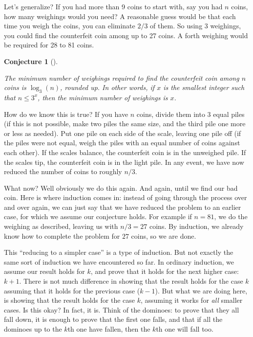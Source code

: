 \documentclass[10pt,]{book}
\theoremstyle{plain}
\newtheorem{conjecture}[theorem]{Conjecture}
\theoremstyle{definition}
\theoremstyle{definition}
\theoremstyle{definition}
\numberwithin{equation}{chapter}
\begin{document}
Let's generalize? If you had more than 9 coins to start with, say you had \(n\) coins, how many weighings would you need? A reasonable guess would be that each time you weigh the coins, you can eliminate \(2/3\) of them. So using 3 weighings, you could find the counterfeit coin among up to 27 coins. A forth weighing would be required for 28 to 81 coins.
%
\begin{conjecture}[]\label{conjecture-1}

The minimum number of weighings required to find the counterfeit coin among \(n\) coins is \(\log_3(n)\), rounded up. In other words, if \(x\) is the smallest integer such that \(n \le 3^x\), then the minimum number of weighings is \(x\).
%
\end{conjecture}
\par

How do we know this is true? If you have \(n\) coins, divide them into 3 equal piles (if this is not possible, make two piles the same size, and the third pile one more or less as needed). Put one pile on each side of the scale, leaving one pile off (if the piles were not equal, weigh the piles with an equal number of coins against each other). If the scales balance, the counterfeit coin is in the unweighed pile. If the scales tip, the counterfeit coin is in the light pile. In any event, we have now reduced the number of coins to roughly \(n/3\).
%
\par

What now? Well obviously we do this again. And again, until we find our bad coin. Here is where induction comes in: instead of going through the process over and over again, we can just say that we have reduced the problem to an earlier case, for which we assume our conjecture holds. For example if \(n =81\), we do the weighing as described, leaving us with \(n/3 = 27\) coins. By induction, we already know how to complete the problem for \(27\) coins, so we are done.
%
\par

This ``reducing to a simpler case'' is a type of induction. But not exactly the same sort of induction we have encountered so far. In ordinary induction, we assume our result holds for \(k\), and prove that it holds for the next higher case: \(k+1\). There is not much difference in showing that the result holds for the case \(k\) assuming that it holds for the previous case (\(k-1\)). But what we are doing here, is showing that the result holds for the case \(k\), assuming it works for \emph{all} smaller cases. Is this okay? In fact, it is. Think of the dominoes: to prove that they all fall down, it is enough to prove that the first one falls, and that if all the dominoes up to the \(k\)th one have fallen, then the \(k\)th one will fall too.
%
\par
\end{document}
